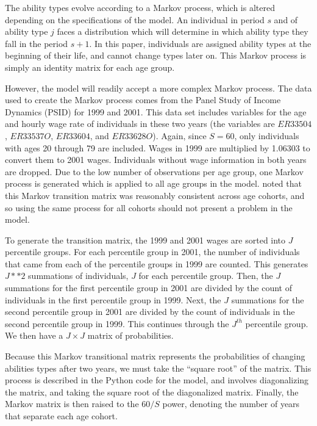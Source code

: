 \documentclass[letterpaper,12pt]{article}
\theoremstyle{definition}
\begin{document}
  The ability types evolve according to a Markov process, which is altered depending on the specifications of the model.  An individual in period $s$ and of ability type $j$ faces a distribution which will determine in which ability type they fall in the period $s+1$.  In this paper, individuals are assigned ability types at the beginning of their life, and cannot change types later on.  This Markov process is simply an identity matrix for each age group.  

  However, the model will readily accept a more complex Markov process.  The data used to create the Markov process comes from the Panel Study of Income Dynamics (PSID) for 1999 and 2001.  This data set includes variables for the age and hourly wage rate of individuals in these two years (the variables are $ER33504$, $ER33537O$, $ER33604$, and $ER33628O$). Again, since $S=60$, only individuals with ages 20 through 79 are included.  Wages in 1999 are multiplied by 1.06303 to convert them to 2001 wages. Individuals without wage information in both years are dropped. Due to the low number of observations per age group, one Markov process is generated which is applied to all age groups in the model. \cite{Nishiyama:2003} noted that this Markov transition matrix was reasonably consistent across age cohorts, and so using the same process for all cohorts should not present a problem in the model.

  To generate the transition matrix, the 1999 and 2001 wages are sorted into $J$ percentile groups.  For each percentile group in 2001, the number of individuals that came from each of the percentile groups in 1999 are counted.  This generates $J ** 2$ summations of individuals, $J$ for each percentile group.  Then, the $J$ summations for the first percentile group in 2001 are divided by the count of individuals in the first percentile group in 1999.  Next, the $J$ summations for the second percentile group in 2001 are divided by the count of individuals in the second percentile group in 1999.  This continues through the $J^{th}$ percentile group.  We then have a $J \times J$ matrix of probabilities.

  Because this Markov transitional matrix represents the probabilities of changing abilities types after two years, we must take the ``square root'' of the matrix.  This process is described in the Python code for the model, and involves diagonalizing the matrix, and taking the square root of the diagonalized matrix.  Finally, the Markov matrix is then raised to the $60/S$ power, denoting the number of years that separate each age cohort.  
\end{document}
